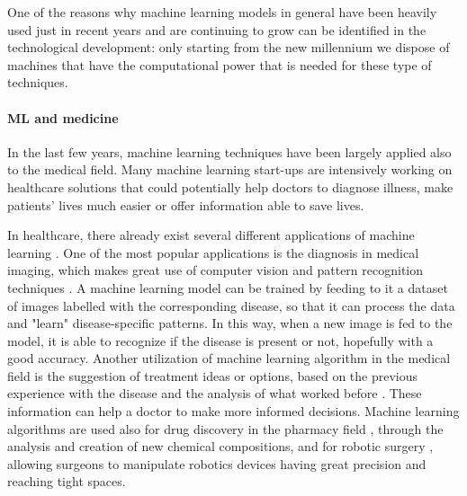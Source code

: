 One of the reasons why machine learning models in general have been heavily used just in recent years and are continuing to grow can be identified in the technological development: only starting from the new millennium we dispose of machines that have the computational power that is needed for these type of techniques.

\paragraph{ML and medicine} In the last few years, machine learning techniques have been largely applied also to the medical field. Many machine learning start-ups are intensively working on healthcare solutions that could potentially help doctors to diagnose illness, make patients' lives much easier or offer information able to save lives.

In healthcare, there already exist several different applications of machine learning \cite{emerj:MLhealthcareapplication}. One of the most popular applications is the diagnosis in medical imaging, which makes great use of computer vision and pattern recognition techniques \cite{arXiv:medicalimg}. A machine learning model can be trained by feeding to it a dataset of images labelled with the corresponding disease, so that it can process the data and "learn" disease-specific patterns. In this way, when a new image is fed to the model, it is able to recognize if the disease is present or not, hopefully with a good accuracy. Another utilization of machine learning algorithm in the medical field is the suggestion of treatment ideas or options, based on the previous experience with the disease and the analysis of what worked before \cite{NCBI:treatmentsuggestion}. These information can help a doctor to make more informed decisions. Machine learning algorithms are used also for drug discovery in the pharmacy field \cite{ScienceDirect:drugdiscovery}, through the analysis and creation of new chemical compositions, and for robotic surgery \cite{ResearchGate:roboticsurgery}, allowing surgeons to manipulate robotics devices having great precision and reaching tight spaces.

